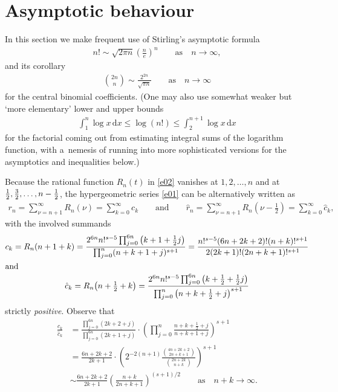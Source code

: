 \documentclass[pdftex]{sigma}
\renewcommand{\d}{{\mathrm d}}
\begin{document}
\section{Asymptotic behaviour}\label{s3}

In this section we make frequent use of Stirling's asymptotic formula
\begin{gather*}
n!\sim\sqrt{2\pi n}\left(\frac ne\right)^n \qquad\text{as}\quad n\to\infty,
\end{gather*}
and its corollary
\begin{gather*}
\binom{2n}n\sim\frac{2^{2n}}{\sqrt{\pi n}} \qquad\text{as}\quad n\to\infty
\end{gather*}
for the central binomial coefficients. (One may also use somewhat weaker but `more elementary' lower and upper bounds
\begin{gather*}
\int_1^n\log x\,\d x\le\log(n!)\le\int_2^{n+1}\log x\,\d x
\end{gather*}
for the factorial coming out from estimating integral sums of the logarithm function, with a~nemesis of running into more sophisticated versions for the asymptotics and inequalities below.)

Because the rational function $R_n(t)$ in \eqref{e02} vanishes at $1,2,\dots,n$ and at $\frac12,\frac32,\dots,\allowbreak n-\nobreak\frac12$,
the hypergeometric series \eqref{e01} can be alternatively written as
\begin{gather*}
r_n=\sum_{\nu=n+1}^\infty R_n(\nu)=\sum_{k=0}^\infty c_k \qquad\text{and}\qquad
\hat r_n=\sum_{\nu=n+1}^\infty R_n(\nu-\tfrac12)=\sum_{k=0}^\infty\hat c_k,
\end{gather*}
with the involved summands
\begin{gather}
c_k=R_n(n+1+k)=\frac{2^{6n}n!^{s-5}\prod_{j=0}^{6n}\big(k+1+\frac12j\big)}{\prod_{j=0}^n(n+k+1+j)^{s+1}}
=\frac{n!^{s-5}(6n+2k+2)! (n+k)!^{s+1}}{2 (2k+1)! (2n+k+1)!^{s+1}}\label{e09}
\\ \intertext{and}
\hat c_k=R_n\big(n+\tfrac12+k\big)=\frac{2^{6n}n!^{s-5}\prod_{j=0}^{6n}\big(k+\frac12+\frac12j\big)} {\prod_{j=0}^n\big(n+k+\frac12+j\big)^{s+1}}\nonumber
\end{gather}
strictly \emph{positive}. Observe that
\begin{align}
\frac{c_k}{\hat c_k}
&=\frac{\prod_{j=0}^{6n}(2k+2+j)}{\prod_{j=0}^{6n}(2k+1+j)}
\cdot\left(\prod_{j=0}^n\frac{n+k+\frac12+j}{n+k+1+j}\right)^{s+1}\nonumber\\
&=\frac{6n+2k+2}{2k+1}\cdot\left(2^{-2(n+1)}\frac{\binom{4n+2k+2}{2n+k+1}}{\binom{2n+2k}{n+k}}\right)^{s+1}\nonumber\\
&\sim\frac{6n+2k+2}{2k+1}\left(\frac{n+k}{2n+k+1}\right)^{(s+1)/2} \qquad\text{as}\quad n+k\to\infty. \label{e10}
\end{align}
\end{document}
